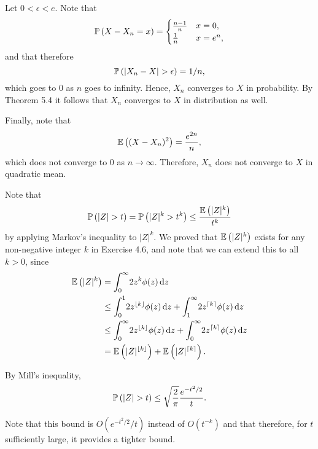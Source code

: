 \begin{ex}
  Let $0<\epsilon<e$. Note that
  \[
    \P{X-X_n=x}=\begin{cases}
      \frac{n-1}{n} & x=0,     \\
      \frac{1}{n}   & x=e^{n},
    \end{cases}
  \]
  and that therefore
  \[
    \P{|X_n-X|>\epsilon}=1/n,
  \]
  which goes to $0$ as $n$ goes to infinity. Hence, $X_n$ converges to $X$ in
  probability. By Theorem 5.4 it follows that $X_n$ converges to $X$ in
  distribution as well.

  Finally, note that
  \[
    \E{(X-X_n)^2}=\frac{e^{2n}}{n},
  \]
  which does not converge to $0$ as $n\to\infty$. Therefore, $X_n$ does not
  converge to $X$ in quadratic mean.
\end{ex}

\begin{ex}
  Note that
  \[
    \P{|Z|>t}
    =\P{|Z|^k>t^k}
    \leq \frac{\E{|Z|^k}}{t^k}
  \]
  by applying Markov's inequality to $|Z|^k$. We proved that $\E{|Z|^k}$
  exists for any non-negative integer $k$ in Exercise 4.6, and note that we can
  extend this to all $k>0$, since
  \begin{align*}
    \E{|Z|^k}
     & =\int_0^\infty\! 2z^k \phi(z)\,\d{z}                      \\
     & \leq \int_0^1\! 2z^{\lfloor k\rfloor} \phi(z)\,\d{z}
    + \int_1^\infty\! 2z^{\lceil k\rceil} \phi(z)\,\d{z}         \\
     & \leq \int_0^\infty\! 2z^{\lfloor k\rfloor} \phi(z)\,\d{z}
    + \int_0^\infty\! 2z^{\lceil k\rceil} \phi(z)\,\d{z}         \\
     & =\E{|Z|^{\lfloor k\rfloor}} + \E{|Z|^{\lceil k\rceil}}.
  \end{align*}

  By Mill's inequality,
  \[
    \P{|Z|>t}\leq \sqrt{\frac{2}{\pi}}\frac{e^{-t^2/2}}{t}.
  \]

  Note that this bound is $O(e^{-t^2/2}/t)$ instead of $O(t^{-k})$ and that
  therefore, for $t$ sufficiently large, it provides a tighter bound.
\end{ex}

